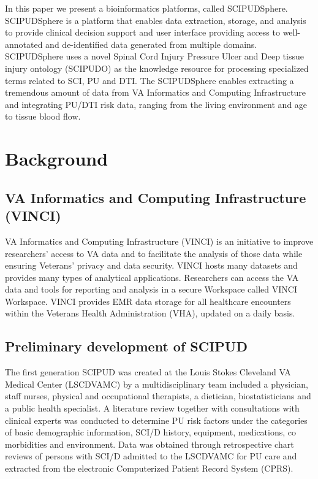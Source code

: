 \documentclass{amia}
\begin{document}
In this paper we present a bioinformatics platforms, called SCIPUDSphere. SCIPUDSphere is a platform that enables data extraction, storage, and analysis to provide clinical decision support and user interface providing access to well-annotated and de-identified data generated from multiple domains. SCIPUDSphere uses a novel Spinal Cord Injury Pressure Ulcer and Deep tissue injury ontology (SCIPUDO) as the knowledge resource for processing specialized terms related to SCI, PU and DTI. The SCIPUDSphere enables extracting a tremendous amount of data from VA Informatics and Computing Infrastructure\cite{VINCI} and integrating PU/DTI risk data, ranging from the living environment and age to tissue blood flow. 

\section{Background}

\subsection{VA Informatics and Computing Infrastructure (VINCI)}
VA Informatics and Computing Infrastructure (VINCI) is an initiative to improve researchers' access to VA data and to facilitate the analysis of those data while ensuring Veterans' privacy and data security. VINCI hosts many datasets and provides many types of analytical applications. Researchers can access the VA data and tools for reporting and analysis in a secure Workspace called VINCI Workspace. VINCI provides EMR data storage for all healthcare encounters within the Veterans Health Administration (VHA), updated on a daily basis. 

\subsection{Preliminary development of SCIPUD}
The first generation SCIPUD was created at the Louis Stokes Cleveland VA Medical Center (LSCDVAMC) by a multidisciplinary team included a physician, staff nurses, physical and occupational therapists, a dietician, biostatisticians and a public health specialist. A literature review \cite{literature_review} together with consultations with clinical experts was conducted to determine PU risk factors under the categories of basic demographic information, SCI/D history, equipment, medications, co morbidities and environment. Data was obtained through retrospective chart reviews of persons with SCI/D admitted to the LSCDVAMC for PU care and extracted from the electronic Computerized Patient Record System (CPRS).
\end{document}
